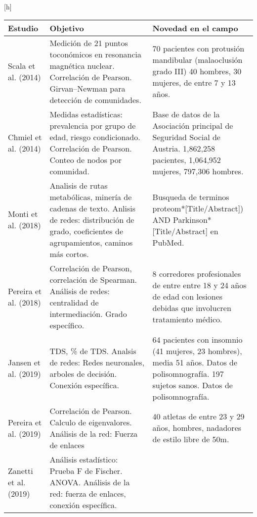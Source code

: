 \documentclass[twoside,twocolumn]{article}
\begin{document}
\begin{center}[h]
  \begin{longtable}{|p{}p{}p{}|}
    \hline
    \textbf{Estudio} & \textbf{Objetivo} & \textbf{Novedad en el campo} \\
    \hline
    Scala et al. (2014) \cite{scala2014complex}&
    Medición de 21 puntos toconómicos en resonancia magnética nuclear.
    Correlación de Pearson.
    Girvan–Newman para detección de comunidades.
    &
    70 pacientes con protusión mandibular (malaoclusión grado III) 40 hombres, 30 mujeres, de entre 7 y 13 años.
    \\\hline
    Chmiel et al. (2014) \cite{chmiel2014spreading} &
    Medidas estadísticas: prevalencia por grupo de edad, riesgo condicionado.
    Correlación de Pearson.
    Conteo de nodos por comunidad.
    &
    Base de datos de la Asociación principal de Seguridad Social de Austria. 1,862,258 pacientes, 1,064,952 mujeres, 797,306 hombres.
    \\\hline
    Monti et al. (2018) \cite{monti2018network} &
    Analisis de rutas metabólicas, minería de cadenas de texto.
    Anlisis de redes: distribución de grado, coeficientes de agrupamientos, caminos más cortos.
    &
    Busqueda de terminos proteom*[Title/Abstract]) AND Parkinson* [Title/Abstract] en PubMed.
    \\\hline
    Pereira et al. (2018) \cite{pereira2018computational} &
    Correlación de Pearson, correlación de Spearman.
    Análisis de redes: centralidad de intermediación. Grado específico.
    &
    8 corredores profesionales de entre entre 18 y 24 años de edad con lesiones debidas que involucren tratamiento médico.
    \\\hline
    Jansen et al. (2019) \cite{jansen2019network} &
    TDS, \% de TDS.
    Analsis de redes: Redes neuronales, arboles de decisión. Conexión específica.
    &
    64 pacientes con insomnio (41 mujeres, 23 hombres), media 51 años. Datos de polisomnografía.
    197 sujetos sanos. Datos de polisomnografía.
    \\\hline
    Pereira et al. (2019) \cite{pereira2019complex} &
    Correlación de Pearson.
    Calculo de eigenvalores.
    Análisis de la red: Fuerza de enlaces
    &
    40 atletas de entre 23 y 29 años, hombres, nadadores de estilo libre de 50m.
    \\\hline
    Zanetti et al. (2019) \cite{zanetti2019information} &
    Análisis estadístico: Prueba F de Fischer. ANOVA.
    Análisis de la red: fuerza de enlaces, conexión específica.

\end{longtable}
\end{center}
\end{document}
